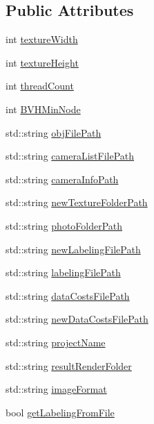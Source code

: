 \subsection*{Public Attributes}
\begin{DoxyCompactItemize}
\item 
int \hyperlink{struct_arguments_a53b1eb430f4ea67ffd9a85696a295cd0}{texture\+Width}
\item 
int \hyperlink{struct_arguments_acba64f044d4603abac85ba2cf1b50b75}{texture\+Height}
\item 
int \hyperlink{struct_arguments_a81212a8036b56467011fb90c075ec4d8}{thread\+Count}
\item 
int \hyperlink{struct_arguments_a90c008ddccf9fc27fc1e7db34b51b36e}{B\+V\+H\+Min\+Node}
\item 
std\+::string \hyperlink{struct_arguments_a5615cc24abc162c63ef3aedc135b0db4}{obj\+File\+Path}
\item 
std\+::string \hyperlink{struct_arguments_a033abba738ba0403e87f883cc203d618}{camera\+List\+File\+Path}
\item 
std\+::string \hyperlink{struct_arguments_a1efe0a7268bb4ab28a51566a13c5f36b}{camera\+Info\+Path}
\item 
std\+::string \hyperlink{struct_arguments_aacc8cf735f8d2793e4fbd81d05f22918}{new\+Texture\+Folder\+Path}
\item 
std\+::string \hyperlink{struct_arguments_a784aabe9dd9bbeb828d1ad845b72887c}{photo\+Folder\+Path}
\item 
std\+::string \hyperlink{struct_arguments_a4a043101d13a6c0540f501af85a691ce}{new\+Labeling\+File\+Path}
\item 
std\+::string \hyperlink{struct_arguments_ad753fef0a788c9868deb592ee39e0528}{labeling\+File\+Path}
\item 
std\+::string \hyperlink{struct_arguments_aaa04b2622a7712dd05c28101c149b116}{data\+Costs\+File\+Path}
\item 
std\+::string \hyperlink{struct_arguments_ae1b263850d63b7595ba4e6fd0ae525b3}{new\+Data\+Costs\+File\+Path}
\item 
std\+::string \hyperlink{struct_arguments_a5ce8b0bed244a327b762f2bb1630708b}{project\+Name}
\item 
std\+::string \hyperlink{struct_arguments_adadef95480756dd3922728cd40b8d334}{result\+Render\+Folder}
\item 
std\+::string \hyperlink{struct_arguments_af545eb82fb55577ba19adeeb5933e619}{image\+Format}
\item 
bool \hyperlink{struct_arguments_ad2a5a8782138866eacf646d57b7ea531}{get\+Labeling\+From\+File}

\end{DoxyCompactItemize}
